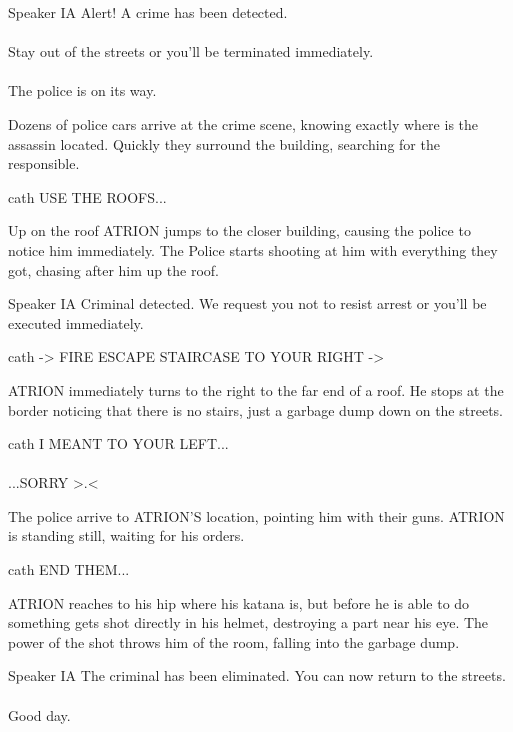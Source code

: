 \documentclass{screenplay}
\begin{document}
\begin{dialogue}{Speaker IA}
Alert! A crime has been detected. \\~\\Stay out of the streets or you'll be terminated immediately.\\~\\
The police is on its way.
\end{dialogue}

Dozens of police cars arrive at the crime scene, knowing exactly where is the assassin located. Quickly they surround the building, searching for the responsible.

\begin{dialogue}{cath}
USE THE ROOFS...
\end{dialogue}
Up on the roof ATRION jumps to the closer building, causing the police to notice him immediately. The Police starts shooting at him with everything they got, chasing after him up the roof.

\begin{dialogue}{Speaker IA}
Criminal detected. We request you not to resist arrest or you'll be executed immediately.
\end{dialogue}
\begin{dialogue}{cath}
-> FIRE ESCAPE STAIRCASE TO YOUR RIGHT ->
\end{dialogue}
ATRION immediately turns to the right to the far end of a roof. He stops at the border noticing that there is no stairs, just a garbage dump down on the streets.

\begin{dialogue}{cath}
I MEANT TO YOUR LEFT... \\~\\
...SORRY >.<
\end{dialogue}

The police arrive to ATRION'S location, pointing him with their guns. ATRION is standing still, waiting for his orders.

\begin{dialogue}{cath}
END THEM...
\end{dialogue}

ATRION reaches to his hip where his katana is, but before he is able to do something gets shot directly in his helmet, destroying a part near his eye. The power of the shot throws him of the room, falling into the garbage dump.
 
\begin{dialogue}{Speaker IA}
The criminal has been eliminated. You can now return to the streets.\\~\\
Good day.
\end{dialogue} 
 
\end{document}
